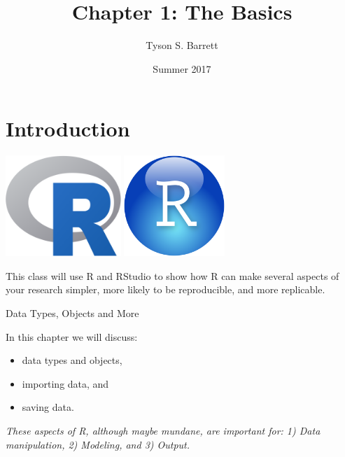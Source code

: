 \documentclass[ignorenonframetext,]{beamer}
\title{Chapter 1: The Basics}
\author{Tyson S. Barrett}
\date{Summer 2017}
\providecommand{\tightlist}{%
\setlength{\itemsep}{0pt}\setlength{\parskip}{0pt}}
\begin{document}
\frame{\titlepage}

\begin{frame}
\tableofcontents[hideallsubsections]
\end{frame}

\section{Introduction}\label{introduction}

\begin{frame}

\centerline{\includegraphics[height=1.5in]{Figures/Rlogo.png} 
\includegraphics[height=1.5in]{Figures/RStudio_logo.png}}

\vspace{6pt}

\centering
This class will use R and RStudio to show how R can make several aspects
of your research simpler, more likely to be reproducible, and more
replicable.

\end{frame}

\begin{frame}{Data Types, Objects and More}

In this chapter we will discuss:

\begin{itemize}[<+->]
\tightlist
\item
  data types and objects,
\item
  importing data, and
\item
  saving data.
\end{itemize}

\emph{These aspects of R, although maybe mundane, are important for: 1)
Data manipulation, 2) Modeling, and 3) Output.}

\end{frame}
\end{document}
